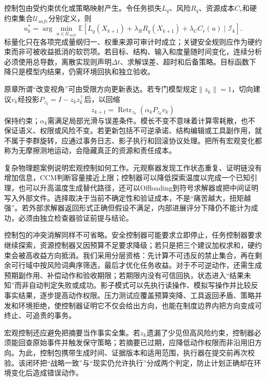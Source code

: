 控制包由受约束优化或策略映射产生。令任务损失$L_q$、风险$R_q$、资源成本$C_r$和硬约束集合$\mathcal{U}_{safe}$分别定义，则
\begin{equation}
u_k^*=\arg\min_{u\in\mathcal{U}_{safe}}
\mathbb{E}\!\left[L_q(X_{k+1})+\lambda_RR_q(X_{k+1})+\lambda_CC_r(u)\mid\mathcal{I}_k\right].
\end{equation}
标量化只在各项完成量纲归一、权重来源可审计时成立；关键安全规则应作为硬约束而非可被收益抵消的软罚项。若目标、结构、输入和度量随时间变化，连续分析必须使用总导数，离散实现则声明$\Delta t$、求解误差、超时和后备策略。目标函数下降只是模型内结果，仍需环境回执和独立验收。

原章所谓“改变视角”可由受限方向更新表达。若专门模型规定$\|z_k\|=1$，切向建议$v_k$经投影$P_{z_k}=I-z_kz_k^\top$后，以回缩
\begin{equation}
z_{k+1}=\operatorname{Retr}_{z_k}(\alpha_kP_{z_k}v_k)
\end{equation}
保持约束；$\alpha_k$需满足局部光滑与误差条件。模长不变不意味着计算零耗散，也不保证语义、权限或风险不变。若更新包括不可逆承诺、结构编辑或工具副作用，就不属于李群旋转，应通过事务日志、影子执行和回滚协议处理。把所有宏观变化都称为无摩擦测地运动，会隐藏真正的资源和责任成本。

复杂物理题案例说明宏观控制如何工作。元观察器发现工作状态重复、证明链没有增加信息，CCM判断容量接近上限；控制器可以降低探索温度以完成一个已知引理，也可以升高温度生成替代路径，还可以Offloading到符号求解器或把中间证明写入外部文件。选择取决于当前不确定性和验证成本，不是“痛苦越大，扭矩越强”。若外部求解器返回形式正确但假设不满足，内部进展评分下降仍不能计为成功，必须由独立检查器验证前提与结论。

控制包的冲突消解同样不可省略。安全控制器可能要求立即停止，任务控制器要求继续探索，资源控制器又因预算不足要求降级；若只是把三个建议加权求和，硬约束会被高收益方向抵消。我们采用分层资格：先计算不可违反的禁止集合，再在剩余可行域中按风险词典序筛选，最后才优化任务收益。对于不可逆动作，还需生成预期副作用、补偿动作和验收期限；若期限内没有可信回执，状态进入“结果未知”而非自动判定失败或成功。影子模式可以先执行读操作、模拟写操作并比较反事实结果，逐步提高动作权限。压力测试应覆盖预算突降、工具返回矛盾、策略并发和环境拒绝，使控制器证明它不仅会给出方向，也能在制度边界内把方向变成可终止、可追责的事务。

宏观控制还应避免把摘要当作事实全集。若$z_k$遗漏了少见但高风险约束，控制器必须能回查原始事件并触发保守策略；若摘要已过期，应降低动作权限而非沿用旧方向。为此，控制包携带生成时间、证据版本和适用范围，执行器在提交前再次校验。该闭环把“战略一致”与“现实仍允许执行”分成两个判定，防止计划正确却在环境变化后造成错误动作。

